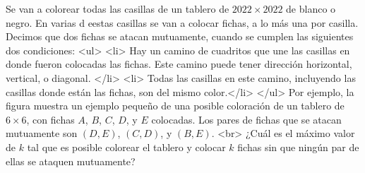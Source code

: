 Se van a colorear todas las casillas de un tablero de $2022\times 2022$ de blanco o negro. En varias d eestas casillas se van a colocar fichas, a lo más una por casilla. Decimos que dos fichas se atacan mutuamente, cuando se cumplen las siguientes dos condiciones:
<ul>
<li> Hay un camino de cuadritos que une las casillas en donde fueron colocadas las fichas. Este camino puede tener dirección horizontal, vertical, o diagonal. </li>
<li> Todas las casillas en este camino, incluyendo las casillas donde están las fichas, son del mismo color.</li>
</ul>
Por ejemplo, la figura muestra un ejemplo pequeño de una posible coloración de un tablero de $6\times 6$, con fichas $A$, $B$, $C$, $D$, y $E$ colocadas. Los pares de fichas que se atacan mutuamente son $(D,E)$, $(C,D)$, y $(B,E)$. <br> 
¿Cuál es el máximo valor de $k$ tal que es posible colorear el tablero y colocar $k$ fichas sin que ningún par de ellas se ataquen mutuamente?
